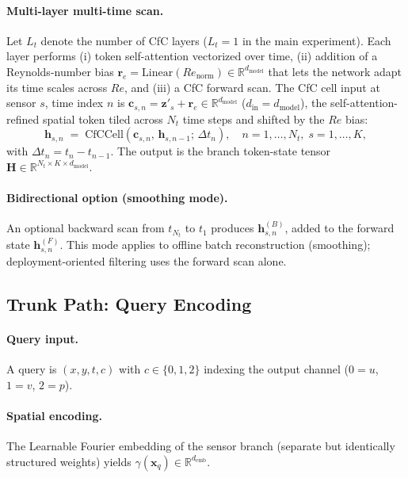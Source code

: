 \paragraph{Multi-layer multi-time scan.}
Let $L_t$ denote the number of CfC layers ($L_t = 1$ in the main experiment). Each layer performs (i) token self-attention vectorized over time, (ii) addition of a Reynolds-number bias $\mathbf{r}_e = \mathrm{Linear}(Re_{\text{norm}}) \in \mathbb{R}^{d_{\text{model}}}$ that lets the network adapt its time scales across $Re$, and (iii) a CfC forward scan. The CfC cell input at sensor $s$, time index $n$ is $\mathbf{c}_{s,n} = \mathbf{z}'_s + \mathbf{r}_e \in \mathbb{R}^{d_{\text{model}}}$ ($d_{\text{in}} = d_{\text{model}}$), the self-attention-refined spatial token tiled across $N_t$ time steps and shifted by the $Re$ bias:
\begin{equation*}
    \mathbf{h}_{s,n} \;=\; \mathrm{CfCCell}(\mathbf{c}_{s,n},\,\mathbf{h}_{s,n-1};\,\Delta t_n),
    \quad n=1,\ldots,N_t,\;s=1,\ldots,K,
\end{equation*}
with $\Delta t_n = t_n - t_{n-1}$. The output is the branch token-state tensor $\mathbf{H}\in\mathbb{R}^{N_t\times K\times d_{\text{model}}}$.

\paragraph{Bidirectional option (smoothing mode).}
An optional backward scan from $t_{N_t}$ to $t_1$ produces $\mathbf{h}^{(B)}_{s,n}$, added to the forward state $\mathbf{h}^{(F)}_{s,n}$. This mode applies to offline batch reconstruction (smoothing); deployment-oriented filtering uses the forward scan alone.

\subsection{Trunk Path: Query Encoding}
\label{subsec:trunk_path}

\paragraph{Query input.}
A query is $(x, y, t, c)$ with $c\in\{0, 1, 2\}$ indexing the output channel ($0\!=\!u$, $1\!=\!v$, $2\!=\!p$).

\paragraph{Spatial encoding.}
The Learnable Fourier embedding of the sensor branch (separate but identically structured weights) yields $\gamma(\mathbf{x}_q) \in \mathbb{R}^{d_{\text{emb}}}$.


